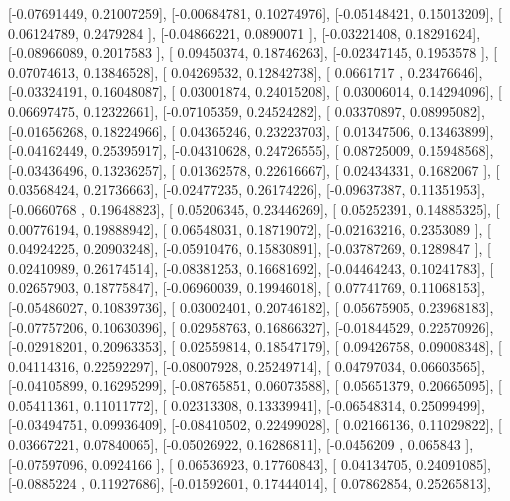\documentclass{article}
\begin{document}
       [-0.07691449,  0.21007259],
       [-0.00684781,  0.10274976],
       [-0.05148421,  0.15013209],
       [ 0.06124789,  0.2479284 ],
       [-0.04866221,  0.0890071 ],
       [-0.03221408,  0.18291624],
       [-0.08966089,  0.2017583 ],
       [ 0.09450374,  0.18746263],
       [-0.02347145,  0.1953578 ],
       [ 0.07074613,  0.13846528],
       [ 0.04269532,  0.12842738],
       [ 0.0661717 ,  0.23476646],
       [-0.03324191,  0.16048087],
       [ 0.03001874,  0.24015208],
       [ 0.03006014,  0.14294096],
       [ 0.06697475,  0.12322661],
       [-0.07105359,  0.24524282],
       [ 0.03370897,  0.08995082],
       [-0.01656268,  0.18224966],
       [ 0.04365246,  0.23223703],
       [ 0.01347506,  0.13463899],
       [-0.04162449,  0.25395917],
       [-0.04310628,  0.24726555],
       [ 0.08725009,  0.15948568],
       [-0.03436496,  0.13236257],
       [ 0.01362578,  0.22616667],
       [ 0.02434331,  0.1682067 ],
       [ 0.03568424,  0.21736663],
       [-0.02477235,  0.26174226],
       [-0.09637387,  0.11351953],
       [-0.0660768 ,  0.19648823],
       [ 0.05206345,  0.23446269],
       [ 0.05252391,  0.14885325],
       [ 0.00776194,  0.19888942],
       [ 0.06548031,  0.18719072],
       [-0.02163216,  0.2353089 ],
       [ 0.04924225,  0.20903248],
       [-0.05910476,  0.15830891],
       [-0.03787269,  0.1289847 ],
       [ 0.02410989,  0.26174514],
       [-0.08381253,  0.16681692],
       [-0.04464243,  0.10241783],
       [ 0.02657903,  0.18775847],
       [-0.06960039,  0.19946018],
       [ 0.07741769,  0.11068153],
       [-0.05486027,  0.10839736],
       [ 0.03002401,  0.20746182],
       [ 0.05675905,  0.23968183],
       [-0.07757206,  0.10630396],
       [ 0.02958763,  0.16866327],
       [-0.01844529,  0.22570926],
       [-0.02918201,  0.20963353],
       [ 0.02559814,  0.18547179],
       [ 0.09426758,  0.09008348],
       [ 0.04114316,  0.22592297],
       [-0.08007928,  0.25249714],
       [ 0.04797034,  0.06603565],
       [-0.04105899,  0.16295299],
       [-0.08765851,  0.06073588],
       [ 0.05651379,  0.20665095],
       [ 0.05411361,  0.11011772],
       [ 0.02313308,  0.13339941],
       [-0.06548314,  0.25099499],
       [-0.03494751,  0.09936409],
       [-0.08410502,  0.22499028],
       [ 0.02166136,  0.11029822],
       [ 0.03667221,  0.07840065],
       [-0.05026922,  0.16286811],
       [-0.0456209 ,  0.065843  ],
       [-0.07597096,  0.0924166 ],
       [ 0.06536923,  0.17760843],
       [ 0.04134705,  0.24091085],
       [-0.0885224 ,  0.11927686],
       [-0.01592601,  0.17444014],
       [ 0.07862854,  0.25265813],
\end{document}
